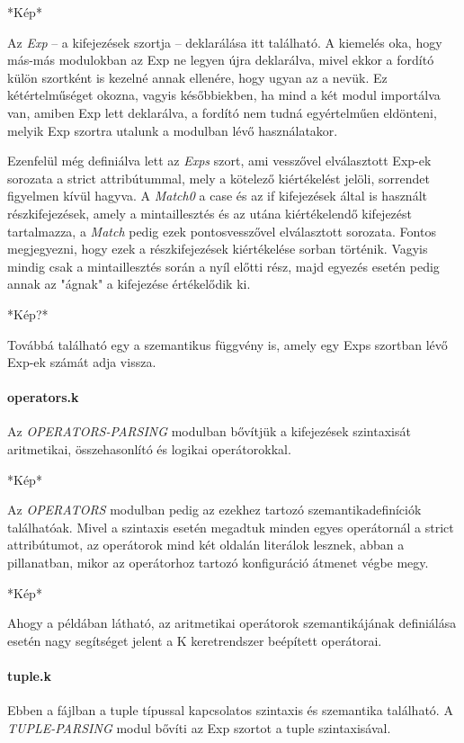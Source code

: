 *Kép*

Az \textit{Exp} -- a kifejezések szortja -- deklarálása itt található. A kiemelés oka, hogy más-más modulokban az Exp ne legyen újra deklarálva, mivel ekkor a fordító külön szortként is kezelné annak ellenére, hogy ugyan az a nevük. Ez kétértelműséget okozna, vagyis későbbiekben, ha mind a két modul importálva van, amiben Exp lett deklarálva, a fordító nem tudná egyértelműen eldönteni, melyik Exp szortra utalunk a modulban lévő használatakor.

Ezenfelül még definiálva lett az \textit{Exps} szort, ami vesszővel elválasztott Exp-ek sorozata a strict attribútummal, mely a kötelező kiértékelést jelöli, sorrendet figyelmen kívül hagyva. A \textit{Match0} a case és az if kifejezések által is használt részkifejezések, amely a mintaillesztés és az utána kiértékelendő kifejezést tartalmazza, a \textit{Match} pedig ezek pontosvesszővel elválasztott sorozata. Fontos megjegyezni, hogy ezek a részkifejezések kiértékelése sorban történik. Vagyis mindig csak a mintaillesztés során a nyíl előtti rész, majd egyezés esetén pedig annak az "ágnak" a kifejezése értékelődik ki.

*Kép?*

Továbbá található egy a szemantikus függvény is, amely egy Exps szortban lévő Exp-ek számát adja vissza.

\paragraph{operators.k}
Az \textit{OPERATORS-PARSING} modulban bővítjük a kifejezések szintaxisát aritmetikai, összehasonlító és logikai operátorokkal.

*Kép*

Az \textit{OPERATORS} modulban pedig az ezekhez tartozó szemantikadefiníciók találhatóak. Mivel a szintaxis esetén megadtuk minden egyes operátornál a strict attribútumot, az operátorok mind két oldalán literálok lesznek, abban a pillanatban, mikor az operátorhoz tartozó konfiguráció átmenet végbe megy.

*Kép*

Ahogy a példában látható, az aritmetikai operátorok szemantikájának definiálása esetén nagy segítséget jelent a K keretrendszer beépített operátorai.

\paragraph{tuple.k}
Ebben a fájlban a tuple típussal kapcsolatos szintaxis és szemantika található. A \textit{TUPLE-PARSING} modul bővíti az Exp szortot a tuple szintaxisával.

